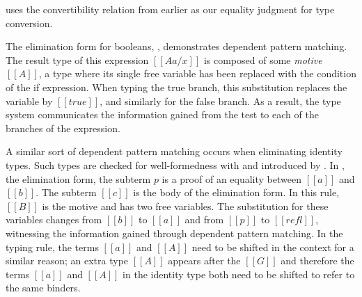\documentclass[acmsmall,screen=true,
\ifpublic review=false\else,review=true\fi
  ,anonymous=\ifanonymous true\else false\fi]{acmart}
\newcommand{\scw}[1]{}
\newcommand{\yl}[1]{}
\begin{document}

 uses the convertibility relation from earlier
as our equality judgment for type conversion.

The elimination form for booleans, , demonstrates dependent pattern
matching.  The result type of this expression $[[A {a / x}]]$ is composed of some
\emph{motive} $[[A]]$, a type where its single free variable has been replaced
with the condition of the if expression. When typing the true branch, this
substitution replaces the variable by $[[true]]$, and similarly for the false
branch. As a result, the type system communicates the information gained from
the %
test to each of the branches of the expression.

A similar sort of dependent pattern matching occurs when eliminating identity
types. Such types are checked for well-formedness with  and
introduced by . In , the elimination form, the subterm
$p$ is a proof of an equality between $[[a]]$ and $[[b]]$. The subterm $[[c]]$
is the body of the elimination form. In this rule, $[[B]]$ is the motive and has two free variables.  The substitution for these
variables changes from $[[b]]$ to $[[a]]$ and from $[[p]]$ to $[[refl]]$,
witnessing the information gained through dependent pattern matching.  In the
typing rule, the terms $[[a]]$ and $[[A]]$ need to be shifted in the context
for a similar reason; an extra type $[[A]]$ appears after the $[[G]]$ and
therefore the terms $[[a]]$ and $[[A]]$ in the identity type both need to be
shifted to refer to the same binders.



\end{document}
